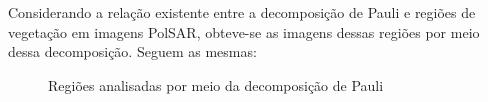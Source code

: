 \documentclass[12pt]{article}
\begin{document}
Considerando a relação existente entre a decomposição de Pauli e regiões de vegetação em imagens PolSAR, obteve-se as imagens dessas regiões por meio dessa decomposição. Seguem as mesmas:

\begin{figure}[hbt]
    \centering
    \qquad
    \vspace{0.05\linewidth}
    \qquad
    \caption{Regiões analisadas por meio da decomposição de Pauli}
    \label{fig:regions_pauli}
\end{figure}
\end{document}
